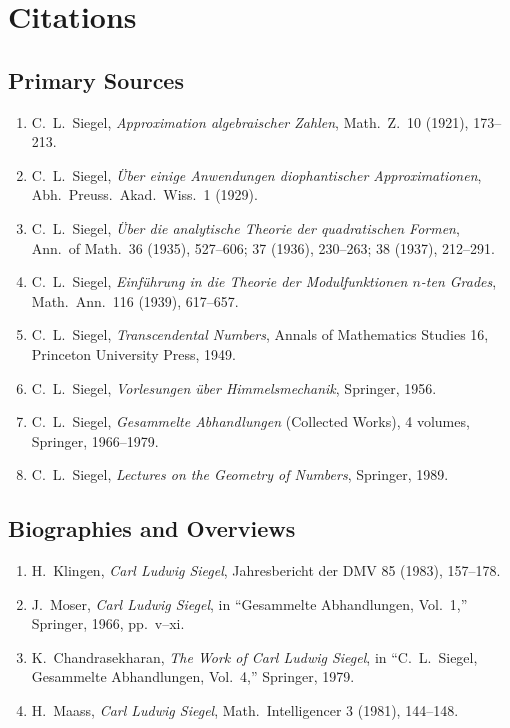 \section{Citations}\subsection*{Primary Sources}
\begin{enumerate}
    \item C.\ L.\ Siegel, \textit{Approximation algebraischer Zahlen}, Math.\ Z.\ 10 (1921), 173--213.
    \item C.\ L.\ Siegel, \textit{{\"U}ber einige Anwendungen diophantischer Approximationen}, Abh.\ Preuss.\ Akad.\ Wiss.\ 1 (1929).
    \item C.\ L.\ Siegel, \textit{{\"U}ber die analytische Theorie der quadratischen Formen}, Ann.\ of Math.\ 36 (1935), 527--606; 37 (1936), 230--263; 38 (1937), 212--291.
    \item C.\ L.\ Siegel, \textit{Einf{\"u}hrung in die Theorie der Modulfunktionen $n$-ten Grades}, Math.\ Ann.\ 116 (1939), 617--657.
    \item C.\ L.\ Siegel, \textit{Transcendental Numbers}, Annals of Mathematics Studies 16, Princeton University Press, 1949.
    \item C.\ L.\ Siegel, \textit{Vorlesungen {\"u}ber Himmelsmechanik}, Springer, 1956.
    \item C.\ L.\ Siegel, \textit{Gesammelte Abhandlungen} (Collected Works), 4 volumes, Springer, 1966--1979.
    \item C.\ L.\ Siegel, \textit{Lectures on the Geometry of Numbers}, Springer, 1989.
\end{enumerate}

\subsection*{Biographies and Overviews}
\begin{enumerate}
    \item H.\ Klingen, \textit{Carl Ludwig Siegel}, Jahresbericht der DMV 85 (1983), 157--178.
    \item J.\ Moser, \textit{Carl Ludwig Siegel}, in ``Gesammelte Abhandlungen, Vol.\ 1,'' Springer, 1966, pp.\ v--xi.
    \item K.\ Chandrasekharan, \textit{The Work of Carl Ludwig Siegel}, in ``C.\ L.\ Siegel, Gesammelte Abhandlungen, Vol.\ 4,'' Springer, 1979.
    \item H.\ Maass, \textit{Carl Ludwig Siegel}, Math.\ Intelligencer 3 (1981), 144--148.
\end{enumerate}

